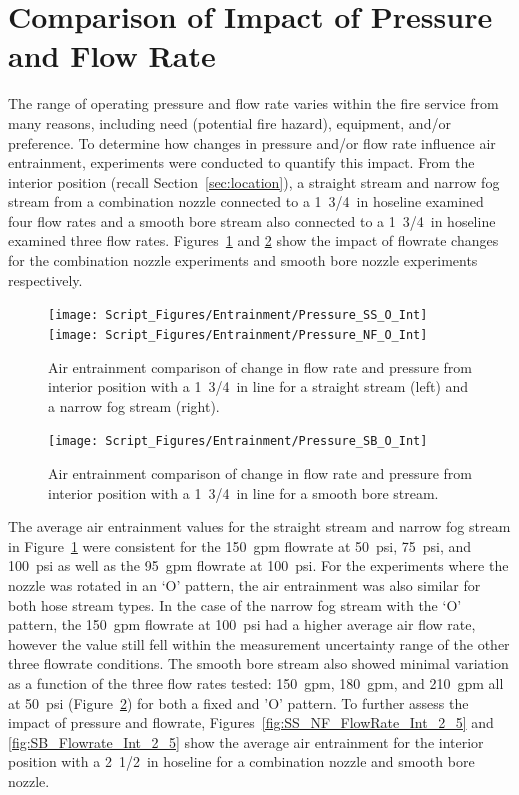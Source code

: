 \documentclass[12pt,oneside]{book}
\begin{document}
\section{Comparison of Impact of Pressure and Flow Rate}
\label{sec:pressure}
The range of operating pressure and flow rate varies within the fire service from many reasons, including need (potential fire hazard), equipment, and/or preference. To determine how changes in pressure and/or flow rate influence air entrainment, experiments were conducted to quantify this impact. From the interior position (recall Section~\ref{sec:location}), a straight stream and narrow fog stream from a combination nozzle connected to a 1~3/4~in hoseline examined four flow rates and a smooth bore stream also connected to a 1~3/4~in hoseline examined three flow rates. Figures~\ref{fig:SS_NF_FlowRate_Int} and \ref{fig:SB_Flowrate_Int} show the impact of flowrate changes for the combination nozzle experiments and smooth bore nozzle experiments respectively.

\begin{figure}[!ht]
\centering
\texttt{[image: Script\_Figures/Entrainment/Pressure\_SS\_O\_Int]}
\texttt{[image: Script\_Figures/Entrainment/Pressure\_NF\_O\_Int]}
\caption[Air Entrainment Comparison of Pressure and Flow Rate for Interior Combination Nozzle from 1~3/4~in Line]{Air entrainment comparison of change in flow rate and pressure from interior position with a 1~3/4~in line for a straight stream (left) and a narrow fog stream (right).}
\label{fig:SS_NF_FlowRate_Int}
\end{figure}

\begin{figure}[!ht]
\centering
\texttt{[image: Script\_Figures/Entrainment/Pressure\_SB\_O\_Int]}
\caption[Air Entrainment Comparison of Pressure and Flow Rate for Interior Smooth Bore Nozzle from 1~3/4~in Line]{Air entrainment comparison of change in flow rate and pressure from interior position with a 1~3/4~in line for a smooth bore stream.}
\label{fig:SB_Flowrate_Int}
\end{figure}

The average air entrainment values for the straight stream and narrow fog stream in Figure~\ref{fig:SS_NF_FlowRate_Int} were consistent for the 150~gpm flowrate at 50~psi, 75~psi, and 100~psi as well as the 95~gpm flowrate at 100~psi. For the experiments where the nozzle was rotated in an `O' pattern, the air entrainment was also similar for both hose stream types. In the case of the narrow fog stream with the `O' pattern, the 150~gpm flowrate at 100~psi had a higher average air flow rate, however the value still fell within the measurement uncertainty range of the other three flowrate conditions. The smooth bore stream also showed minimal variation as a function of the three flow rates tested: 150~gpm, 180~gpm, and 210~gpm all at 50~psi (Figure~\ref{fig:SB_Flowrate_Int}) for both a fixed and 'O' pattern. To further assess the impact of pressure and flowrate, Figures~\ref{fig:SS_NF_FlowRate_Int_2_5} and \ref{fig:SB_Flowrate_Int_2_5} show the average air entrainment for the interior position with a 2~1/2~in hoseline for a combination nozzle and smooth bore nozzle.
\end{document}
